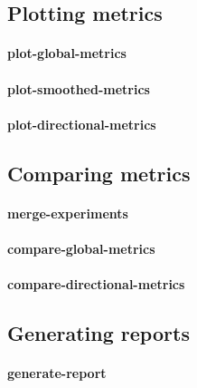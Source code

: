 \subsection{Plotting metrics}

\paragraph{plot-global-metrics}
\paragraph{plot-smoothed-metrics}
\paragraph{plot-directional-metrics}

\subsection{Comparing metrics}

\paragraph{merge-experiments}

\paragraph{compare-global-metrics}
\paragraph{compare-directional-metrics}

\subsection{Generating reports}

\paragraph{generate-report}
